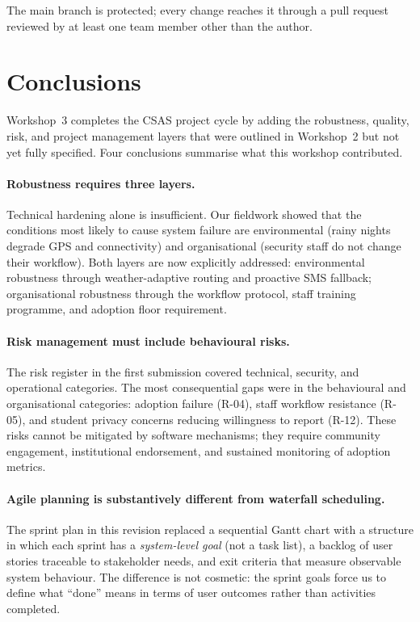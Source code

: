 \documentclass[12pt,a4paper]{article}
\begin{document}
The main branch is protected; every change reaches it through a pull
request reviewed by at least one team member other than the author.

\section{Conclusions}

Workshop~3 completes the CSAS project cycle by adding the robustness,
quality, risk, and project management layers that were outlined in
Workshop~2 but not yet fully specified. Four conclusions summarise
what this workshop contributed.

\paragraph{Robustness requires three layers.}
Technical hardening alone is insufficient. Our fieldwork showed
that the conditions most likely to cause system failure are
environmental (rainy nights degrade GPS and connectivity) and
organisational (security staff do not change their workflow). Both
layers are now explicitly addressed: environmental robustness through
weather-adaptive routing and proactive SMS fallback; organisational
robustness through the workflow protocol, staff training programme,
and adoption floor requirement.

\paragraph{Risk management must include behavioural risks.}
The risk register in the first submission covered technical,
security, and operational categories. The most consequential gaps
were in the behavioural and organisational categories: adoption
failure (R-04), staff workflow resistance (R-05), and student privacy
concerns reducing willingness to report (R-12). These risks
cannot be mitigated by software mechanisms; they require community
engagement, institutional endorsement, and sustained monitoring of
adoption metrics.

\paragraph{Agile planning is substantively different from waterfall scheduling.}
The sprint plan in this revision replaced a sequential Gantt chart
with a structure in which each sprint has a \emph{system-level goal}
(not a task list), a backlog of user stories traceable to stakeholder
needs, and exit criteria that measure observable system behaviour.
The difference is not cosmetic: the sprint goals force us to define
what ``done'' means in terms of user outcomes rather than activities
completed.
\end{document}
